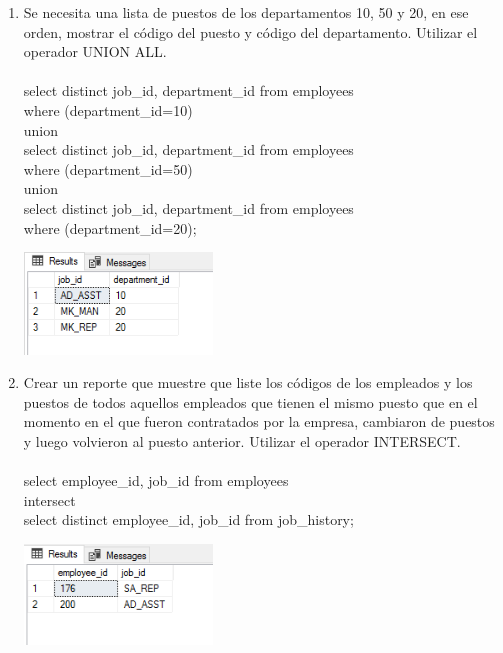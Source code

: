 \begin{enumerate}[1.]
	\item Se necesita una lista de puestos de los departamentos 10, 50 y 20, en ese orden, mostrar el c\'odigo del puesto y c\'odigo del departamento. Utilizar el operador UNION ALL.
	\\
	\\select distinct job\_id, department\_id from employees
	\\where (department\_id=10) 	
	\\union
	\\select distinct job\_id, department\_id from employees
	\\where (department\_id=50)
	\\union
	\\select distinct job\_id, department\_id from employees
	\\where  (department\_id=20);

	\begin{center}
	\includegraphics[width=5cm]{./Imagenes/ejercicio10-3} 
	\end{center}

	\item Crear un reporte que muestre que liste los c\'odigos de los empleados y los puestos de todos aquellos empleados que tienen el mismo puesto que en el momento en el que fueron contratados por la empresa, cambiaron de puestos y luego volvieron al puesto anterior. Utilizar el operador INTERSECT.
	\\
	\\select employee\_id, job\_id from employees
	\\intersect
	\\select distinct employee\_id, job\_id from job\_history;

	\begin{center}
	\includegraphics[width=5cm]{./Imagenes/ejercicio10-4} 
	\end{center}


\end{enumerate}
